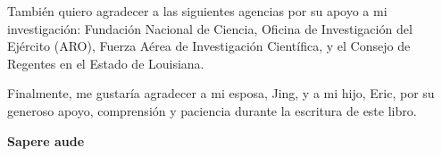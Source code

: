 \documentclass[
	spanish, %
	letterpaper, oneside
]{book}
\begin{document}
\begin{dedicatory}

	También quiero agradecer a las siguientes agencias por su apoyo a mi investigación: Fundación Nacional de Ciencia, Oficina de Investigación del Ejército (ARO), Fuerza Aérea de Investigación Científica, y el Consejo de Regentes en el Estado de Louisiana.


	Finalmente, me gustaría agradecer a mi esposa, Jing, y a mi hijo, Eric, por su generoso apoyo, comprensión y paciencia durante la escritura de este libro.

	\textbf{Sapere aude}
\end{dedicatory}


\templateIndex

\templateFinalcfg











\end{document}
